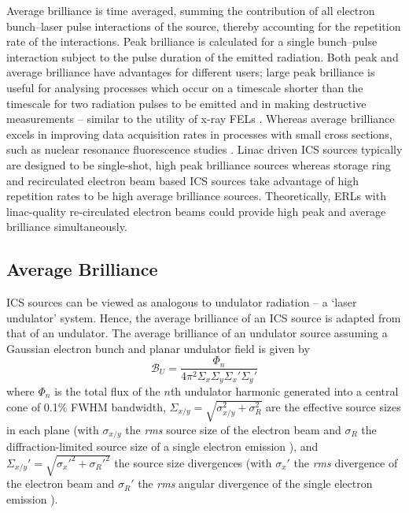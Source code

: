 \documentclass[../main.tex]{subfiles}
\begin{document}
Average brilliance is time averaged, summing the contribution of all electron bunch--laser pulse interactions of the source, thereby accounting for the repetition rate of the interactions. Peak brilliance is calculated for a single bunch--pulse interaction subject to the pulse duration of the emitted radiation. Both peak and average brilliance have advantages for different users; large peak brilliance is useful for analysing processes which occur on a timescale shorter than the timescale for two radiation pulses to be emitted and in making destructive measurements -- similar to the utility of x-ray FELs \cite{emma2010first}. Whereas average brilliance excels in improving data acquisition rates in processes with small cross sections, such as nuclear resonance fluorescence studies \cite{angell2015demonstration}. Linac driven ICS sources typically are designed to be single-shot, high peak brilliance sources whereas storage ring and recirculated electron beam based ICS sources take advantage of high repetition rates to be high average brilliance sources. Theoretically, ERLs with linac-quality re-circulated electron beams could provide high peak and average brilliance simultaneously.   

\subsection{Average Brilliance}

ICS sources can be viewed as analogous to undulator radiation -- a `laser undulator' system. Hence, the average brilliance of an ICS source is adapted from that of an undulator. The average brilliance of an undulator source assuming a Gaussian electron bunch and planar undulator field \cite{chao2013handbook} is given by 
\begin{equation}
\mathcal{B}_{U} = \frac{\Phi_{n}}{4\pi^{2}\Sigma_{x}\Sigma_{y}\Sigma_{x}'\Sigma_{y}'}
\label{eq:undulator_brightness}    
\end{equation}
where $\Phi_{n}$ is the total flux of the $n$th undulator harmonic generated into a central cone of 0.1\% FWHM bandwidth, $\Sigma_{x/y} = \sqrt{\sigma_{x/y}^{2}+\sigma_{R}^{2}}$ are the effective source sizes in each plane (with $\sigma_{x/y}$ the \textit{rms} source size of the electron beam and $\sigma_{R}$ the diffraction-limited source size of a single electron emission \cite{kim1987brightness}), and $\Sigma_{x/y}' = \sqrt{\sigma_{x}'^{2}+\sigma_{R}'^{2}}$ the source size divergences (with $\sigma_{x}'$ the \textit{rms} divergence of the electron beam and $\sigma_{R}'$ the \textit{rms} angular divergence of the single electron emission \cite{krinsky1983undulators}). 
\end{document}

